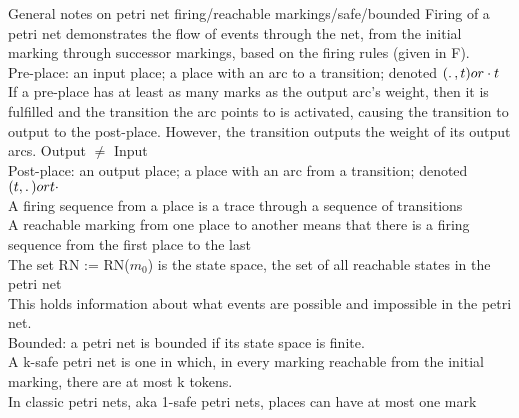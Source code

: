 General notes on petri net firing/reachable markings/safe/bounded
Firing of a petri net demonstrates the flow of events through the net, from the initial marking through successor markings, based on the firing rules (given in F).\\
Pre-place: an input place; a place with an arc to a transition; denoted $(\ldotp , t) or  \cdot t$\\
If a pre-place has at least as many marks as the output arc's weight, then it is fulfilled and the transition the arc points to is activated, causing the transition to output to the post-place. However, the transition outputs the weight of its output arcs. Output $\ne$ Input\\
Post-place: an output place; a place with an arc from a transition; denoted $(t, \ldotp ) or t \cdot $ \\
A firing sequence from a place is a trace through a sequence of transitions\\
A reachable marking from one place to another means that there is a firing sequence from the first place to the last\\
The set RN := RN($m_0$) is the state space, the set of all reachable states in the petri net\\
This holds information about what events are possible and impossible in the petri net.\\
Bounded: a petri net is bounded if its state space is finite. \smallskip\\

A k-safe petri net is one in which, in every marking reachable from the initial marking, there are at most k tokens.\\
In classic petri nets, aka 1-safe petri nets, places can have at most one mark\\
 

